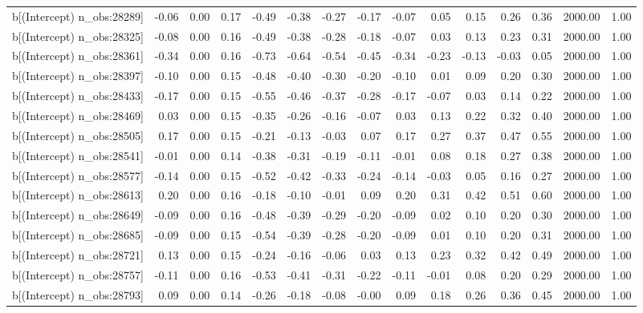 \begin{table}[ht]
\begin{tabular}{rrrrrrrrrrrrrrr}
  b[(Intercept) n\_obs:28289] & -0.06 & 0.00 & 0.17 & -0.49 & -0.38 & -0.27 & -0.17 & -0.07 & 0.05 & 0.15 & 0.26 & 0.36 & 2000.00 & 1.00 \\ 
  b[(Intercept) n\_obs:28325] & -0.08 & 0.00 & 0.16 & -0.49 & -0.38 & -0.28 & -0.18 & -0.07 & 0.03 & 0.13 & 0.23 & 0.31 & 2000.00 & 1.00 \\ 
  b[(Intercept) n\_obs:28361] & -0.34 & 0.00 & 0.16 & -0.73 & -0.64 & -0.54 & -0.45 & -0.34 & -0.23 & -0.13 & -0.03 & 0.05 & 2000.00 & 1.00 \\ 
  b[(Intercept) n\_obs:28397] & -0.10 & 0.00 & 0.15 & -0.48 & -0.40 & -0.30 & -0.20 & -0.10 & 0.01 & 0.09 & 0.20 & 0.30 & 2000.00 & 1.00 \\ 
  b[(Intercept) n\_obs:28433] & -0.17 & 0.00 & 0.15 & -0.55 & -0.46 & -0.37 & -0.28 & -0.17 & -0.07 & 0.03 & 0.14 & 0.22 & 2000.00 & 1.00 \\ 
  b[(Intercept) n\_obs:28469] & 0.03 & 0.00 & 0.15 & -0.35 & -0.26 & -0.16 & -0.07 & 0.03 & 0.13 & 0.22 & 0.32 & 0.40 & 2000.00 & 1.00 \\ 
  b[(Intercept) n\_obs:28505] & 0.17 & 0.00 & 0.15 & -0.21 & -0.13 & -0.03 & 0.07 & 0.17 & 0.27 & 0.37 & 0.47 & 0.55 & 2000.00 & 1.00 \\ 
  b[(Intercept) n\_obs:28541] & -0.01 & 0.00 & 0.14 & -0.38 & -0.31 & -0.19 & -0.11 & -0.01 & 0.08 & 0.18 & 0.27 & 0.38 & 2000.00 & 1.00 \\ 
  b[(Intercept) n\_obs:28577] & -0.14 & 0.00 & 0.15 & -0.52 & -0.42 & -0.33 & -0.24 & -0.14 & -0.03 & 0.05 & 0.16 & 0.27 & 2000.00 & 1.00 \\ 
  b[(Intercept) n\_obs:28613] & 0.20 & 0.00 & 0.16 & -0.18 & -0.10 & -0.01 & 0.09 & 0.20 & 0.31 & 0.42 & 0.51 & 0.60 & 2000.00 & 1.00 \\ 
  b[(Intercept) n\_obs:28649] & -0.09 & 0.00 & 0.16 & -0.48 & -0.39 & -0.29 & -0.20 & -0.09 & 0.02 & 0.10 & 0.20 & 0.30 & 2000.00 & 1.00 \\ 
  b[(Intercept) n\_obs:28685] & -0.09 & 0.00 & 0.15 & -0.54 & -0.39 & -0.28 & -0.20 & -0.09 & 0.01 & 0.10 & 0.20 & 0.31 & 2000.00 & 1.00 \\ 
  b[(Intercept) n\_obs:28721] & 0.13 & 0.00 & 0.15 & -0.24 & -0.16 & -0.06 & 0.03 & 0.13 & 0.23 & 0.32 & 0.42 & 0.49 & 2000.00 & 1.00 \\ 
  b[(Intercept) n\_obs:28757] & -0.11 & 0.00 & 0.16 & -0.53 & -0.41 & -0.31 & -0.22 & -0.11 & -0.01 & 0.08 & 0.20 & 0.29 & 2000.00 & 1.00 \\ 
  b[(Intercept) n\_obs:28793] & 0.09 & 0.00 & 0.14 & -0.26 & -0.18 & -0.08 & -0.00 & 0.09 & 0.18 & 0.26 & 0.36 & 0.45 & 2000.00 & 1.00 \\ 

\end{tabular}
\end{table}

